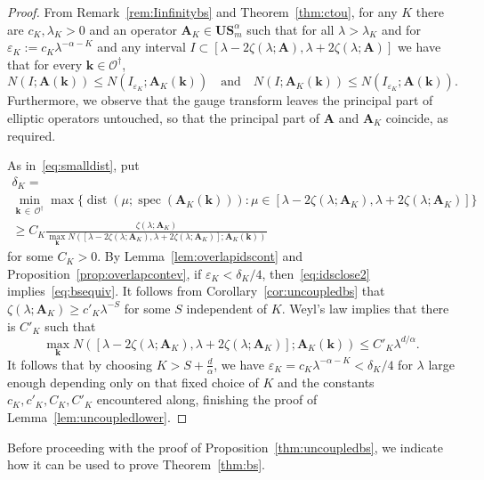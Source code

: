 \documentclass[10pt]{amsart}
\theoremstyle{definition}\newtheorem{defi}[theo]{Definition}\newtheorem{rema}[theo]{Remark}\newtheorem{exam}[theo]{Example}\newtheorem{nota}[theo]{Notation}
\DeclareMathOperator{\spec}{spec}
\DeclareMathOperator{\dist}{dist}
\newcommand{\CO}{\mathcal{O}}
\newcommand{\BA}{\mathbf A}
\newcommand{\BS}{\mathbf S}
\newcommand{\BU}{\mathbf U}
\newcommand{\bk}{\mathbf k}
\newcommand{\eps}{\varepsilon}
\begin{document}
\begin{proof}
From Remark~\ref{rem:Iinfinitybs} and Theorem~\ref{thm:ctou}, for any $K$ there are $c_K, \lambda_K > 0$ and an operator $\BA_K \in
\BU\BS_m^\alpha$ such that for all $\lambda > \lambda_K$ and for $\eps_K := c_K \lambda^{-\alpha - K}$ and any interval $I \subset [\lambda - 2 \zeta(\lambda;\BA),\lambda + 2
\zeta(\lambda;\BA)]$ we have that for every $\bk \in \CO^\dagger$,
\begin{equation}\label{eq:idsclose2}
N(I;\BA(\bk)) \le N(I_{\eps_K};\BA_K(\bk)) \quad \text{and} \quad N(I;\BA_K(\bk)) \le N(I_{\eps_K};\BA(\bk)).
\end{equation}
Furthermore, we observe that the gauge transform leaves the principal part of elliptic operators untouched, so that the principal part of $\BA$ and $\BA_K$ coincide, as required.


As in~\eqref{eq:smalldist}, put
\begin{multline}
\delta_K =\\
\min_{\bk\,\in\,\CO^\dagger} \max\big\{\dist(\mu;\spec(\BA_K(\bk))) : \mu \in [\lambda - 2\zeta(\lambda;\BA_K),\lambda + 2\zeta(\lambda;\BA_K)]\big\} \\
 \ge C_K \frac{\zeta(\lambda;\BA_K)}{\max_\bk N([\lambda - 2\zeta(\lambda;\BA_K),\lambda + 2 \zeta(\lambda;\BA_K)];\BA_K(\bk))}
\end{multline}
for some $C_K > 0$. By Lemma~\ref{lem:overlapidscont} and Proposition~\ref{prop:overlapcontev}, if $\eps_K < \delta_K/4$, then~\eqref{eq:idsclose2} implies~\eqref{eq:bsequiv}. It follows from Corollary~\ref{cor:uncoupledbs} that $\zeta(\lambda;\BA_K) \ge c'_K\lambda^{-S}$ for some $S$ independent of $K$. Weyl's law implies that there is $C'_K$ such that
\begin{equation}
\max_\bk N([\lambda - 2
\zeta(\lambda;\BA_K),\lambda + 2\zeta(\lambda;\BA_K)];\BA_K(\bk)) \le C'_K \lambda^{d/\alpha}.
\end{equation}
It follows that by choosing $K > S + \frac d \alpha$, we have $\eps_K = c_K
\lambda^{-\alpha - K} < \delta_K/4$ for $\lambda$ large enough depending only on that fixed choice of $K$ and the constants $c_K,c'_K,C_K,C'_K$ encountered along, finishing the proof of Lemma~\ref{lem:uncoupledlower}.
\end{proof}


Before proceeding with the proof of Proposition~\ref{thm:uncoupledbs}, we indicate how it can be used to prove Theorem~\ref{thm:bs}.
\end{document}
